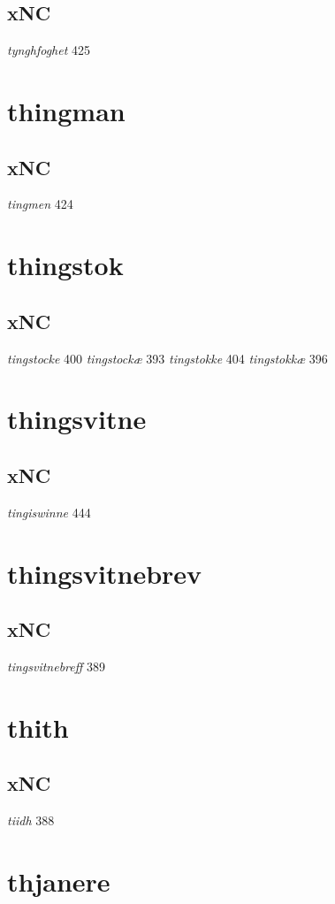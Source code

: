 \documentclass[a4paper,twocolumn]{article}
\begin{document}
\subsection{xNC}
\label{sec:org6e2888f}
\emph{tynghfoghet} 425 
\section{thingman}
\label{sec:orgd50ec66}
\subsection{xNC}
\label{sec:org8690a12}
\emph{tingmen} 424 
\section{thingstok}
\label{sec:org01b8c99}
\subsection{xNC}
\label{sec:org585ef1a}
\emph{tingstocke} 400 \emph{tingstockæ} 393 \emph{tingstokke} 404 \emph{tingstokkæ} 396 
\section{thingsvitne}
\label{sec:orgf8b0d83}
\subsection{xNC}
\label{sec:org95e246b}
\emph{tingiswinne} 444 
\section{thingsvitnebrev}
\label{sec:org786adec}
\subsection{xNC}
\label{sec:org990e539}
\emph{tingsvitnebreff} 389 
\section{thith}
\label{sec:orgffeef3e}
\subsection{xNC}
\label{sec:org7c958cb}
\emph{tiidh} 388 
\section{thjanere}
\label{sec:orgf63804b}
\end{document}
